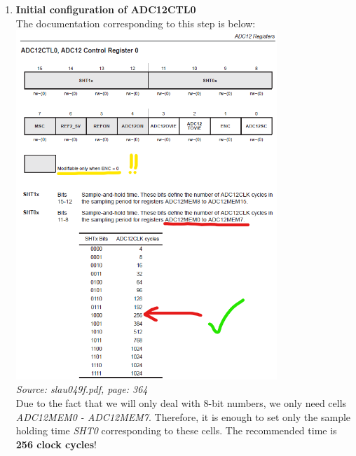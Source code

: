\documentclass{article}
\begin{document}
\begin{enumerate}[label=\arabic*.]
    \item \textbf{Initial configuration of ADC12CTL0}
\vspace{3mm} \\
The documentation corresponding to this step is below: \\
\includegraphics[width=0.775\textwidth]{"../img/slau049f_364.png"} \\
\textit{Source: slau049f.pdf, page: 364}
\vspace{3mm} \\
Due to the fact that we will only deal with 8-bit numbers, we only need cells \textit{ADC12MEM0 - ADC12MEM7}.
Therefore, it is enough to set only the sample holding time \textit{SHT0} corresponding to these cells. The recommended time is \textbf{256 clock cycles}! \\
\vspace{3mm} \\

\end{enumerate}
\end{document}
